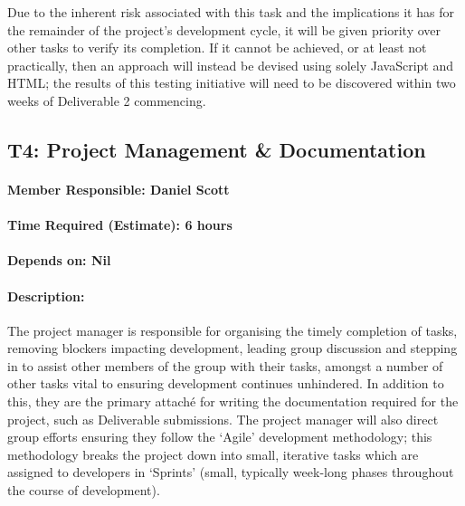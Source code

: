 \documentclass[
  paper=a4,
  ,captions=tableheading
]{scrartcl}
\begin{document}
Due to the inherent risk associated with this task and the implications
it has for the remainder of the project's development cycle, it will be
given priority over other tasks to verify its completion. If it cannot
be achieved, or at least not practically, then an approach will instead
be devised using solely JavaScript and HTML; the results of this testing
initiative will need to be discovered within two weeks of Deliverable 2
commencing.

\newpage
\hypertarget{t4-project-management-documentation}{%
\subsection{T4: Project Management \&
Documentation}\label{t4-project-management-documentation}}

\hypertarget{member-responsible-daniel-scott}{%
\paragraph{Member Responsible: Daniel
Scott}\label{member-responsible-daniel-scott}}

\hypertarget{time-required-estimate-6-hours}{%
\paragraph{Time Required (Estimate): 6
hours}\label{time-required-estimate-6-hours}}

\hypertarget{depends-on-nil}{%
\paragraph{Depends on: Nil}\label{depends-on-nil}}

\hypertarget{description-2}{%
\paragraph{Description:}\label{description-2}}

The project manager is responsible for organising the timely completion
of tasks, removing blockers impacting development, leading group
discussion and stepping in to assist other members of the group with
their tasks, amongst a number of other tasks vital to ensuring
development continues unhindered. In addition to this, they are the
primary attaché for writing the documentation required for the project,
such as Deliverable submissions. The project manager will also direct
group efforts ensuring they follow the `Agile' development methodology;
this methodology breaks the project down into small, iterative tasks
which are assigned to developers in `Sprints' (small, typically
week-long phases throughout the course of development).
\end{document}
